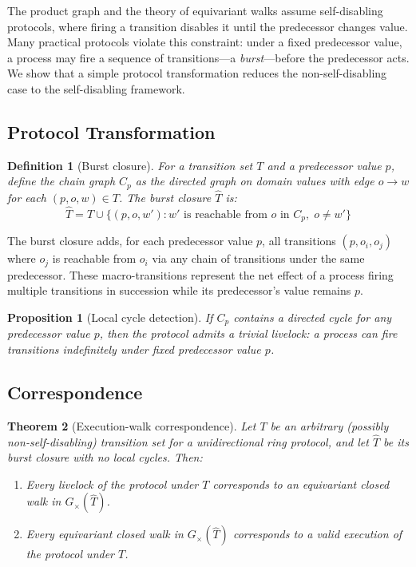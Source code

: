 \documentclass[11pt]{article}
\newtheorem{theorem}{Theorem}
\newtheorem{proposition}[theorem]{Proposition}
\newtheorem{definition}{Definition}
\begin{document}
The product graph and the theory of equivariant walks assume self-disabling protocols, where firing a transition disables it until the predecessor changes value. Many practical protocols violate this constraint: under a fixed predecessor value, a process may fire a sequence of transitions---a \emph{burst}---before the predecessor acts. We show that a simple protocol transformation reduces the non-self-disabling case to the self-disabling framework.

\subsection{Protocol Transformation}

\begin{definition}[Burst closure]
\label{def:burst}
For a transition set $T$ and a predecessor value $p$, define the \emph{chain graph} $C_p$ as the directed graph on domain values with edge $o \to w$ for each $(p, o, w) \in T$. The \emph{burst closure} $\hat{T}$ is:
\[
\hat{T} = T \cup \{(p, o, w') : w' \text{ is reachable from } o \text{ in } C_p,\; o \neq w'\}
\]
\end{definition}

The burst closure adds, for each predecessor value $p$, all transitions $(p, o_i, o_j)$ where $o_j$ is reachable from $o_i$ via any chain of transitions under the same predecessor. These macro-transitions represent the net effect of a process firing multiple transitions in succession while its predecessor's value remains $p$.

\begin{proposition}[Local cycle detection]
If $C_p$ contains a directed cycle for any predecessor value $p$, then the protocol admits a trivial livelock: a process can fire transitions indefinitely under fixed predecessor value $p$.
\end{proposition}

\subsection{Correspondence}

\begin{theorem}[Execution-walk correspondence]
\label{thm:burst-correspondence}
Let $T$ be an arbitrary (possibly non-self-disabling) transition set for a unidirectional ring protocol, and let $\hat{T}$ be its burst closure with no local cycles. Then:
\begin{enumerate}[nosep]
\item Every livelock of the protocol under $T$ corresponds to an equivariant closed walk in $G_\times(\hat{T})$.
\item Every equivariant closed walk in $G_\times(\hat{T})$ corresponds to a valid execution of the protocol under $T$.
\end{enumerate}
\end{theorem}
\end{document}
